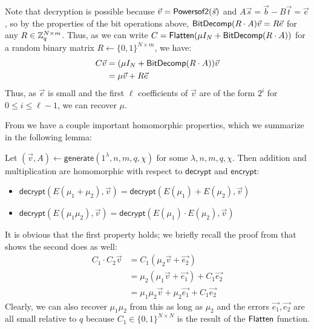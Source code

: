 Note that decryption is possible because $\vec{v} = \mathsf{Powersof2}(\vec{s})$ and $A\vec{s} = \vec{b} - B\vec{t} = \vec{e}$, so by the properties of the bit operations above, $\mathsf{BitDecomp}(R\cdot A)\vec{v} = R\vec{e}$ for any $R \in \mathbb{Z}_q^{N \times m}$.  Thus, as we can write $C = \mathsf{Flatten}(\mu I_N + \mathsf{BitDecomp}(R\cdot A))$ for a random binary matrix $R \leftarrow \{0,1\}^{N\times m}$, we have:
\begin{align*}
C\vec{v} &= (\mu I_N + \mathsf{BitDecomp}(R\cdot A))\vec{v}\\
&= \mu \vec{v} + R\vec{e}
\end{align*}
Thus, as $\vec{e}$ is small and the first $\ell$ coefficients of $\vec{v}$ are of the form $2^i$ for $0 \leq i \leq \ell-1$, we can recover $\mu$.

From \cite{gsw} we have a couple important homomorphic properties, which we summarize in the following lemma:

\begin{lemma}
\label{gswprop}
Let $(\vec{v}, A) \leftarrow \mathsf{generate}(1^\lambda, n, m, q, \chi)$ for some $\lambda, n, m, q, \chi$.  Then addition and multiplication are homomorphic with respect to $\mathsf{decrypt}$ and $\mathsf{encrypt}$:
\begin{itemize}
\item $\mathsf{decrypt}(E(\mu_1 + \mu_2), \vec{v}) = \mathsf{decrypt}(E(\mu_1) + E(\mu_2), \vec{v})$
\item $\mathsf{decrypt}(E(\mu_1\mu_2), \vec{v}) = \mathsf{decrypt}(E(\mu_1)\cdot E(\mu_2), \vec{v})$
\end{itemize}
\end{lemma}

It is obvious that the first property holds; we briefly recall the proof from \cite{gsw} that shows the second does as well:
\begin{align*}
C_1\cdot C_2\vec{v} &= C_1(\mu_2\vec{v} + \vec{e_2})\\
&= \mu_2(\mu_1\vec{v} + \vec{e_1}) + C_1\vec{e_2}\\
&= \mu_1\mu_2\vec{v} + \mu_2\vec{e_1} + C_1\vec{e_2}
\end{align*}
Clearly, we can also recover $\mu_1\mu_2$ from this as long as $\mu_2$ and the errors $\vec{e_1}, \vec{e_2}$ are all small relative to $q$ because $C_1 \in \{0,1\}^{N\times N}$ is the result of the $\mathsf{Flatten}$ function.
